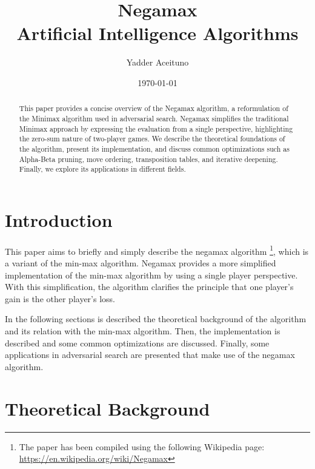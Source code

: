 \documentclass{LSkill}  %
\begin{document}
\title{%
    \Huge\bfseries Negamax \\[0.5em]
    \large\mdseries Artificial Intelligence Algorithms
}
\author{Yadder Aceituno}
\date{\today}

\maketitle 

\begin{abstract}
This paper provides a concise overview of the Negamax algorithm, a reformulation of the Minimax algorithm used in adversarial search. Negamax simplifies the traditional Minimax approach by expressing the evaluation from a single perspective, highlighting the zero-sum nature of two-player games. We describe the theoretical foundations of the algorithm, present its implementation, and discuss common optimizations such as Alpha-Beta pruning, move ordering, transposition tables, and iterative deepening. Finally, we explore its applications in different fields.
\end{abstract}

\tableofcontents

\section{Introduction}
This paper aims to briefly and simply describe the negamax algorithm \footnote{\label{fn:negamax}The paper has been compiled using the following Wikipedia page: \url{https://en.wikipedia.org/wiki/Negamax}}, which is a variant of the min-max algorithm. 
Negamax provides a more simplified implementation of the min-max algorithm by using a single player perspective. 
With this simplification, the algorithm clarifies the principle that one player's gain is the other player's loss.

In the following sections is described the theoretical background of the algorithm and its relation with the min-max algorithm. Then, the implementation is described and some common optimizations are discussed. Finally, some applications in adversarial search are presented that make use of the negamax algorithm. 

\section{Theoretical Background}
\end{document}
